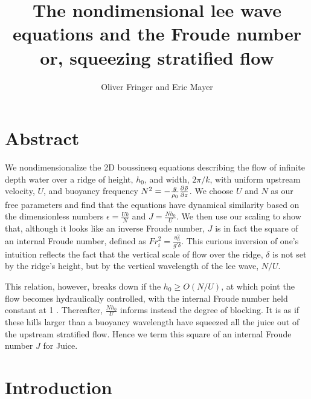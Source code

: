 \documentclass[12pt]{article}
\begin{document}
	
	\title{The nondimensional lee wave equations and the Froude number\\
		\large or, squeezing stratified flow}
	
	\author{Oliver Fringer and Eric Mayer}
	
	\maketitle
	
	\section{Abstract}
	We nondimensionalize the 2D boussinesq equations describing the flow of infinite depth water over a ridge of height, $h_0$, and width, $2\pi/k$, with uniform upstream velocity, $U$, and buoyancy frequency $N^2=-\frac{g}{\rho_0}\frac{\partial{\bar{\rho}}}{\partial{z}}$. We choose $U$ and $N$ as our free parameters and find that the equations have dynamical similarity based on the dimensionless numbers $\epsilon=\frac{Uk}{N}$ and $J=\frac{Nh_0}{U}$. We then use our scaling to show that, although it looks like an inverse Froude number, $J$ is in fact the square of an internal Froude number, defined as $Fr_i^2=\frac{u_0^2}{g'\delta}$. This curious inversion of one's intuition reflects the fact that the vertical scale of flow over the ridge, $\delta$ is not set by the ridge's height, but by the vertical wavelength of the lee wave, $N/U$.
	
	This relation, however, breaks down if the  $h_0\geq O(N/U)$, at which point the flow becomes hydraulically controlled, with the internal Froude number held constant at 1 \citep{Winters2012}. Thereafter, $\frac{Nh_0}{U}$ informs instead the degree of blocking. It is as if these hills larger than a buoyancy wavelength have squeezed all the juice out of the upstream stratified flow. Hence we term this square of an internal Froude number $J$ for Juice. 
	
	\section{Introduction}
	
	
\end{document}
